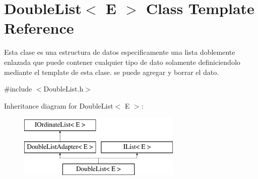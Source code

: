 \hypertarget{class_double_list}{\section{Double\-List$<$ E $>$ Class Template Reference}
\label{class_double_list}
}


Esta clase es una estructura de datos especificamente una lista doblemente enlazada que puede contener cualquier tipo de dato solamente definiciendolo mediante el template de esta clase. se puede agregar y borrar el dato.  




{\ttfamily \#include $<$Double\-List.\-h$>$}

Inheritance diagram for Double\-List$<$ E $>$\-:\begin{figure}[H]
\begin{center}
\leavevmode
\includegraphics[height=3.000000cm]{class_double_list}
\end{center}
\end{figure}
